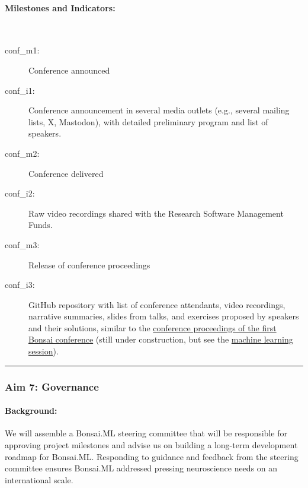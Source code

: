 \paragraph{Milestones and Indicators:}\mbox{}\\

\begin{description}

    \item[conf\_m1:] Conference announced

    \item[conf\_i1:] Conference announcement in several media outlets (e.g.,
        several mailing lists, X, Mastodon), with detailed preliminary program
        and list of speakers.

    \item[conf\_m2:] Conference delivered

    \item[conf\_i2:] Raw video recordings shared with the Research Software
        Management Funds.

    \item[conf\_m3:] Release of conference proceedings

    \item[conf\_i3:] GitHub repository with list of conference attendants,
        video recordings, narrative summaries, slides from talks, and exercises
        proposed by speakers and their solutions, similar to the
        \href{https://github.com/joacorapela/bonsaiConference2024Proceedings}{conference
        proceedings of the first Bonsai conference} (still under construction,
        but see the
        \href{https://github.com/joacorapela/bonsaiConference2024Proceedings/blob/master/sessions/machineLearning/README.md}{machine
        learning session}).
\end{description}

\noindent\rule{\textwidth}{1pt}
\subsubsection{Aim 7: Governance}

\paragraph{Background:} We will assemble a Bonsai.ML steering committee that
will be responsible for approving project milestones and advise us on building
a long-term development roadmap for Bonsai.ML.  Responding to guidance and
feedback from the steering committee ensures Bonsai.ML addressed pressing
neuroscience needs on an international scale.

